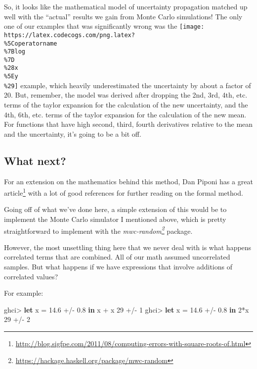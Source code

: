 \documentclass[]{article}
\newenvironment{Shaded}{}{}
\newcommand{\DecValTok}[1]{\textcolor[rgb]{0.25,0.63,0.44}{#1}}
\newcommand{\FloatTok}[1]{\textcolor[rgb]{0.25,0.63,0.44}{#1}}
\newcommand{\FunctionTok}[1]{\textcolor[rgb]{0.02,0.16,0.49}{#1}}
\newcommand{\KeywordTok}[1]{\textcolor[rgb]{0.00,0.44,0.13}{\textbf{#1}}}
\newcommand{\NormalTok}[1]{#1}
\renewcommand{\href}[2]{#2\footnote{\url{#1}}}
\begin{document}
So, it looks like the mathematical model of uncertainty propagation matched up
well with the ``actual'' results we gain from Monte Carlo simulations! The only
one of our examples that was significantly wrong was the
\texttt{[image: https://latex.codecogs.com/png.latex?\\\%5Coperatorname\\\%7Blog\\\%7D\\\%28x\\\%5Ey\\\%29]}
example, which heavily underestimated the uncertainty by about a factor of 20.
But, remember, the model was derived after dropping the 2nd, 3rd, 4th, etc.
terms of the taylor expansion for the calculation of the new uncertainty, and
the 4th, 6th, etc. terms of the taylor expansion for the calculation of the new
mean. For functions that have high second, third, fourth derivatives relative to
the mean and the uncertainty, it's going to be a bit off.

\hypertarget{what-next}{%
\subsection{What next?}\label{what-next}}

For an extension on the mathematics behind this method, Dan Piponi has a
\href{http://blog.sigfpe.com/2011/08/computing-errors-with-square-roots-of.html}{great
article} with a lot of good references for further reading on the formal method.

Going off of what we've done here, a simple extension of this would be to
implement the Monte Carlo simulator I mentioned above, which is pretty
straightforward to implement with the
\emph{\href{https://hackage.haskell.org/package/mwc-random}{mwc-random}}
package.

However, the most unsettling thing here that we never deal with is what happens
correlated terms that are combined. All of our math assumed uncorrelated
samples. But what happens if we have expressions that involve additions of
correlated values?

For example:

\begin{Shaded}
\begin{Highlighting}[]
\NormalTok{ghci}\FunctionTok{>} \KeywordTok{let}\NormalTok{ x }\FunctionTok{=} \FloatTok{14.6} \FunctionTok{+/-} \FloatTok{0.8} \KeywordTok{in}\NormalTok{ x }\FunctionTok{+}\NormalTok{ x}
\DecValTok{29} \FunctionTok{+/-} \DecValTok{1}
\NormalTok{ghci}\FunctionTok{>} \KeywordTok{let}\NormalTok{ x }\FunctionTok{=} \FloatTok{14.6} \FunctionTok{+/-} \FloatTok{0.8} \KeywordTok{in} \DecValTok{2}\FunctionTok{*}\NormalTok{x}
\DecValTok{29} \FunctionTok{+/-} \DecValTok{2}
\end{Highlighting}
\end{Shaded}
\end{document}

